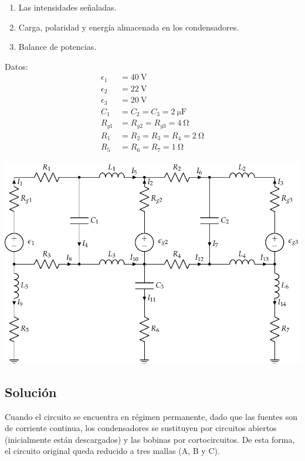 \documentclass[10pt]{article}
\begin{document}
\begin{enumerate}
\item Las intensidades señaladas.
\item Carga, polaridad y energía almacenada en los condensadores.
\item Balance de potencias.
\end{enumerate}


\begin{minipage}[c]{0.2\linewidth}
  Datos:
  \begin{align*}
    \epsilon_{1}&=\SI{40}{\volt}\\
    \epsilon_{2}&=\SI{22}{\volt}\\
    \epsilon_{3}&=\SI{20}{\volt}\\
    C_{1}&=C_{2}=C_{3}=\SI{2}{\micro\farad}\\
    R_{g1}&=R_{g2}=R_{g3}=\SI{4}{\ohm}\\
    R_{1}&=R_{2}=R_{3}=R_{4}=\SI{2}{\ohm}\\
    R_{5}&=R_{6}=R_{7}=\SI{1}{\ohm}
  \end{align*}
\end{minipage}
\begin{minipage}[c]{0.8\linewidth}
  \includegraphics[scale = 0.8]{figs/mallas_condensadores_bobinas.pdf}
\end{minipage}

\subsection*{Solución}

Cuando el circuito se encuentra en régimen permanente, dado que las
fuentes son de corriente continua, los condensadores se sustituyen
por circuitos abiertos (inicialmente están descargados) y las bobinas
por cortocircuitos. De esta forma, el circuito original queda reducido
a tres mallas (A, B y C).
\end{document}
